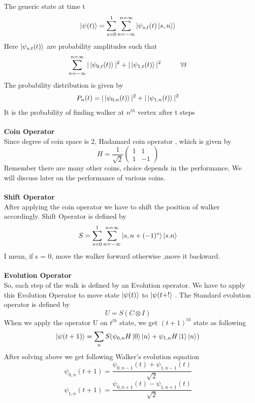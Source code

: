 \documentclass[11 pt]{article}
\theoremstyle{definition}
\theoremstyle{remark}
\newcommand{\tens}[1]{
  \mathbin{\mathop{\otimes}\limits_{#1}}}
\begin{document}
The generic state at time t $$\ket{\psi(t)} = \sum_{s=0}^{1}\sum_{n=-\infty}^{n=\infty}\ket{\psi_{s,t}(t)\ket{s,n}}$$
Here $\ket{\psi_{s,t}(t)}$ are probability amplitudes such that 
$$\sum_{n=-\infty}^{n=\infty}|\ket{\psi_{0,t}(t)}|^2 + |\ket{\psi_{1,t}(t)}|^2 \hspace{1cm}\forall t $$
The probability distribution is given by
$$P_n(t) = |\ket{\psi_{0,n}(t)}|^2 + |\ket{\psi_{1,n}(t)}|^2 $$
It is the probability of finding walker at $n^{th}$ vertex after t steps\\
\\
\textbf{Coin Operator}\\
Since degree of coin space is 2, Hadamard coin operator , which is given by $$H  = \dfrac{1}{\sqrt{2}}\begin{pmatrix}
           1 & 1\\
           1 & -1
\end{pmatrix}$$
Remember there are many other coins, choice depends in the performance. We will discuss later on the performance of various coins.
\\
\\
\textbf{Shift Operator}\\
After applying the coin operator we have to shift the position of walker accordingly. Shift Operator is defined by 
$$ S = \sum_{s=0}^{1}\sum_{n=-\infty}^{n=\infty} \ket{s,n+(-1)^s}\ket{s.n}$$
I mean, if s = 0, move the walker forward otherwise ,move it backward.
\\
\\
\textbf{Evolution Operator}\\
So, each step of the walk is defined by an Evolution operator. We have to apply this Evolution Operator to move state $\ket{\psi(t)}$ to $\ket{\psi(t+!}$ . The Standard evolution operator is defined by 
$$U = S(C\tens{}I)$$
When we apply the operator U on $t^{th}$ state, we get $(t+1)^{th}$ state as following
$$\ket{\psi(t+1)} = \sum_{n}S(\psi_{0,n}H\ket{0}\ket{n}+\psi_{1,n}H\ket{1}\ket{n})$$
After solving above we get following Walker's evolution equation
$$\psi_{0,n}(t+1) = \dfrac{\psi_{0,n-1}(t) + \psi_{1,n-1}(t)}{\sqrt{2}}$$
    $$\psi_{1,n}(t+1) = \dfrac{\psi_{0,n+1}(t) - \psi_{1,n+1}(t)}{\sqrt{2}}$$
\end{document}
